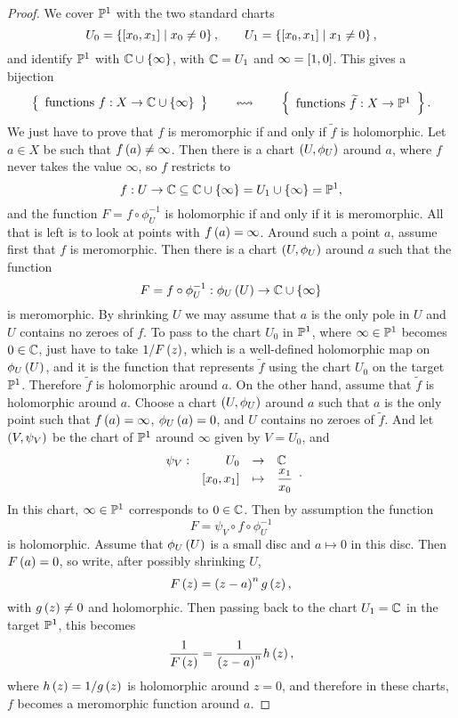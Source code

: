 \begin{proof}
We cover $ \P^1 $ with the two standard charts
$$ U_0 = \cb{\sb{x_0, x_1} \mid x_0 \ne 0}, \qquad U_1 = \cb{\sb{x_0, x_1} \mid x_1 \ne 0}, $$
and identify $ \P^1 $ with $ \C \cup \cb{\infty} $, with $ \C = U_1 $ and $ \infty = \sb{1, 0} $. This gives a bijection
$$ \correspondence{\text{functions} \ f : X \to \C \cup \cb{\infty}}{\text{functions} \ \widetilde{f} : X \to \P^1}. $$
We just have to prove that $ f $ is meromorphic if and only if $ \widetilde{f} $ is holomorphic. Let $ a \in X $ be such that $ f\rb{a} \ne \infty $. Then there is a chart $ \rb{U, \phi_U} $ around $ a $, where $ f $ never takes the value $ \infty $, so $ f $ restricts to
$$ f : U \to \C \subseteq \C \cup \cb{\infty} = U_1 \cup \cb{\infty} = \P^1, $$
and the function $ F = f \circ \phi_U^{-1} $ is holomorphic if and only if it is meromorphic. All that is left is to look at points with $ f\rb{a} = \infty $. Around such a point $ a $, assume first that $ f $ is meromorphic. Then there is a chart $ \rb{U, \phi_U} $ around $ a $ such that the function
$$ F = f \circ \phi_U^{-1} : \phi_U\rb{U} \to \C \cup \cb{\infty} $$
is meromorphic. By shrinking $ U $ we may assume that $ a $ is the only pole in $ U $ and $ U $ contains no zeroes of $ f $. To pass to the chart $ U_0 $ in $ \P^1 $, where $ \infty \in \P^1 $ becomes $ 0 \in \C $, just have to take $ 1 / F\rb{z} $, which is a well-defined holomorphic map on $ \phi_U\rb{U} $, and it is the function that represents $ \widetilde{f} $ using the chart $ U_0 $ on the target $ \P^1 $. Therefore $ \widetilde{f} $ is holomorphic around $ a $. On the other hand, assume that $ \widetilde{f} $ is holomorphic around $ a $. Choose a chart $ \rb{U, \phi_U} $ around $ a $ such that $ a $ is the only point such that $ f\rb{a} = \infty $, $ \phi_U\rb{a} = 0 $, and $ U $ contains no zeroes of $ \widetilde{f} $. And let $ \rb{V, \psi_V} $ be the chart of $ \P^1 $ around $ \infty $ given by $ V = U_0 $, and
$$ \function[\psi_V]{U_0}{\C}{\sb{x_0, x_1}}{\dfrac{x_1}{x_0}}. $$
In this chart, $ \infty \in \P^1 $ corresponds to $ 0 \in \C $. Then by assumption the function
$$ F = \psi_V \circ f \circ \phi_U^{-1} $$
is holomorphic. Assume that $ \phi_U\rb{U} $ is a small disc and $ a \mapsto 0 $ in this disc. Then $ F\rb{a} = 0 $, so write, after possibly shrinking $ U $,
$$ F\rb{z} = \rb{z - a}^ng\rb{z}, $$
with $ g\rb{z} \ne 0 $ and holomorphic. Then passing back to the chart $ U_1 = \C $ in the target $ \P^1 $, this becomes
$$ \dfrac{1}{F\rb{z}} = \dfrac{1}{\rb{z - a}^n}h\rb{z}, $$
where $ h\rb{z} = 1 / g\rb{z} $ is holomorphic around $ z = 0 $, and therefore in these charts, $ f $ becomes a meromorphic function around $ a $.
\end{proof}

